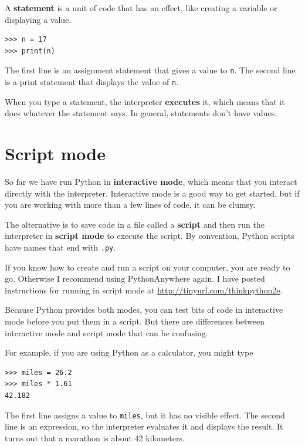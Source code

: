 \documentclass[10pt]{book}
\begin{document}
A {\bf statement} is a unit of code that has an effect, like
creating a variable or displaying a value.

\begin{verbatim}
>>> n = 17
>>> print(n)
\end{verbatim}
%
The first line is an assignment statement that gives a value to
{\tt n}.  The second line is a print statement that displays the
value of {\tt n}.

When you type a statement, the interpreter {\bf executes} it,
which means that it does whatever the statement says.  In general,
statements don't have values.


\section{Script mode}

So far we have run Python in {\bf interactive mode}, which
means that you interact directly with the interpreter.
Interactive mode is a good way to get started,
but if you are working with more than a few lines of code, it can be
clumsy.

The alternative is to save code in a file called a {\bf script} and
then run the interpreter in {\bf script mode} to execute the script.  By
convention, Python scripts have names that end with {\tt .py}.

If you know how to create and run a script on your computer, you
are ready to go.  Otherwise I recommend using PythonAnywhere again.
I have posted instructions for running in script mode at
\url{http://tinyurl.com/thinkpython2e}.

Because Python provides both modes,
you can test bits of code in interactive mode before you put them
in a script.  But there are differences between interactive mode
and script mode that can be confusing.

For example, if you are using Python as a calculator, you might type

\begin{verbatim}
>>> miles = 26.2
>>> miles * 1.61
42.182
\end{verbatim}

The first line assigns a value to {\tt miles}, but it has no visible
effect.  The second line is an expression, so the
interpreter evaluates it and displays the result.  It turns out that a
marathon is about 42 kilometers.
\end{document}
